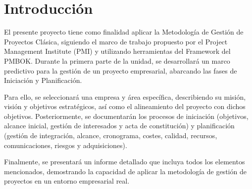 \vspace*{\fill}

\section{Introducción}

  El presente proyecto tiene como finalidad aplicar la Metodología de Gestión de Proyectos Clásica, siguiendo el marco de trabajo propuesto por el Project Management Institute (PMI) y utilizando herramientas del Framework del PMBOK. Durante la primera parte de la unidad, se desarrollará un marco predictivo para la gestión de un proyecto empresarial, abarcando las fases de Iniciación y Planificación.

  Para ello, se seleccionará una empresa y área específica, describiendo su misión, visión y objetivos estratégicos, así como el alineamiento del proyecto con dichos objetivos. Posteriormente, se documentarán los procesos de iniciación (objetivos, alcance inicial, gestión de interesados y acta de constitución) y planificación (gestión de integración, alcance, cronograma, costes, calidad, recursos, comunicaciones, riesgos y adquisiciones).

  Finalmente, se presentará un informe detallado que incluya todos los elementos mencionados, demostrando la capacidad de aplicar la metodología de gestión de proyectos en un entorno empresarial real.

\vspace*{\fill}